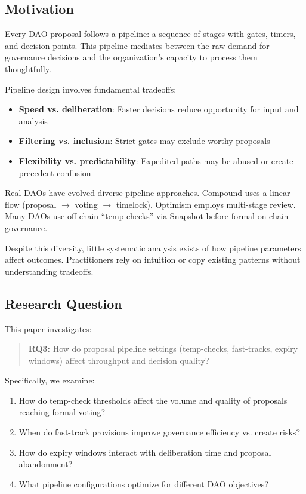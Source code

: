
\subsection{Motivation}

Every DAO proposal follows a pipeline: a sequence of stages with gates, timers, and decision points. This pipeline mediates between the raw demand for governance decisions and the organization's capacity to process them thoughtfully.

Pipeline design involves fundamental tradeoffs:
\begin{itemize}
    \item \textbf{Speed vs. deliberation}: Faster decisions reduce opportunity for input and analysis
    \item \textbf{Filtering vs. inclusion}: Strict gates may exclude worthy proposals
    \item \textbf{Flexibility vs. predictability}: Expedited paths may be abused or create precedent confusion
\end{itemize}

Real DAOs have evolved diverse pipeline approaches. Compound uses a linear flow (proposal $\rightarrow$ voting $\rightarrow$ timelock). Optimism employs multi-stage review. Many DAOs use off-chain ``temp-checks'' via Snapshot before formal on-chain governance.

Despite this diversity, little systematic analysis exists of how pipeline parameters affect outcomes. Practitioners rely on intuition or copy existing patterns without understanding tradeoffs.

\subsection{Research Question}

This paper investigates:

\begin{quote}
\textbf{RQ3:} How do proposal pipeline settings (temp-checks, fast-tracks, expiry windows) affect throughput and decision quality?
\end{quote}

Specifically, we examine:
\begin{enumerate}
    \item How do temp-check thresholds affect the volume and quality of proposals reaching formal voting?
    \item When do fast-track provisions improve governance efficiency vs. create risks?
    \item How do expiry windows interact with deliberation time and proposal abandonment?
    \item What pipeline configurations optimize for different DAO objectives?
\end{enumerate}

